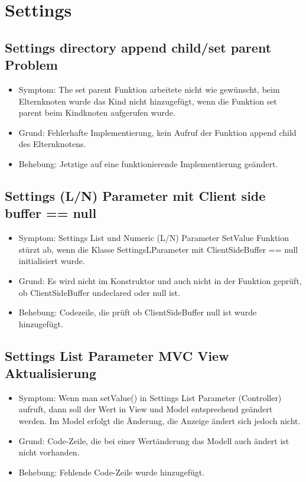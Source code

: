 \documentclass[qualitaetssicherung.tex]{subfiles}
\begin{document}
\section{Settings}

	\subsection{Settings directory append child/set parent Problem}
		\begin{itemize}
			\item
			Symptom: The set parent Funktion arbeitete nicht wie gewünscht, beim Elternknoten wurde das Kind nicht hinzugefügt, wenn die Funktion set parent beim Kindknoten aufgerufen wurde. 
			\item
			Grund: Fehlerhafte Implementierung, kein Aufruf der Funktion append child des Elternknotens.
			\item
			Behebung: Jetztige auf eine funktionierende Implementierung geändert.
		\end{itemize}
	
	\subsection{Settings (L/N) Parameter mit Client side buffer == null}
		\begin{itemize}
			\item
			Symptom: Settings List und Numeric (L/N) Parameter SetValue Funktion stürzt ab, wenn die Klasse SettingsLParameter mit ClientSideBuffer == null initialisiert wurde.
			\item
			Grund: Es wird nicht im Konstruktor und auch nicht in der Funktion geprüft, ob ClientSideBuffer undeclared oder null ist.
			\item
			Behebung: Codezeile, die prüft ob ClientSideBuffer null ist wurde hinzugefügt.
		\end{itemize}
	
	\subsection{Settings List Parameter MVC View Aktualisierung}
		\begin{itemize}
			\item
			Symptom: Wenn man setValue() in Settings List Parameter (Controller) aufruft, dann soll der Wert in View und Model entsprechend geändert werden. Im Model erfolgt die Änderung, die Anzeige ändert sich jedoch nicht.
			\item
			Grund: Code-Zeile, die bei einer Wertänderung das Modell auch ändert ist nicht vorhanden.
			\item
			Behebung: Fehlende Code-Zeile wurde hinzugefügt.
		\end{itemize}
		
\end{document}

